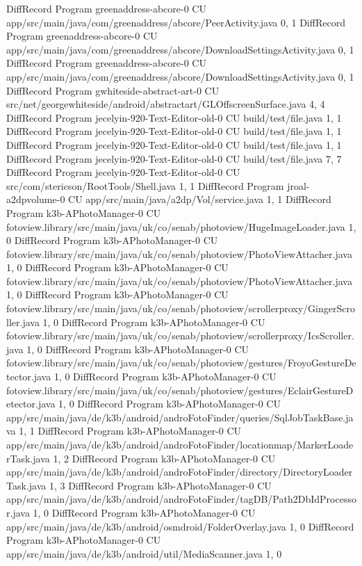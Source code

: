 DiffRecord Program greenaddress-abcore-0 CU app/src/main/java/com/greenaddress/abcore/PeerActivity.java  {0, 1}
DiffRecord Program greenaddress-abcore-0 CU app/src/main/java/com/greenaddress/abcore/DownloadSettingsActivity.java  {0, 1}
DiffRecord Program greenaddress-abcore-0 CU app/src/main/java/com/greenaddress/abcore/DownloadSettingsActivity.java  {0, 1}
DiffRecord Program gwhiteside-abstract-art-0 CU src/net/georgewhiteside/android/abstractart/GLOffscreenSurface.java  {4, 4}
DiffRecord Program jecelyin-920-Text-Editor-old-0 CU build/test/file.java  {1, 1}
DiffRecord Program jecelyin-920-Text-Editor-old-0 CU build/test/file.java  {1, 1}
DiffRecord Program jecelyin-920-Text-Editor-old-0 CU build/test/file.java  {1, 1}
DiffRecord Program jecelyin-920-Text-Editor-old-0 CU build/test/file.java  {7, 7}
DiffRecord Program jecelyin-920-Text-Editor-old-0 CU src/com/stericson/RootTools/Shell.java  {1, 1}
DiffRecord Program jroal-a2dpvolume-0 CU app/src/main/java/a2dp/Vol/service.java  {1, 1}
DiffRecord Program k3b-APhotoManager-0 CU fotoview.library/src/main/java/uk/co/senab/photoview/HugeImageLoader.java  {1, 0}
DiffRecord Program k3b-APhotoManager-0 CU fotoview.library/src/main/java/uk/co/senab/photoview/PhotoViewAttacher.java  {1, 0}
DiffRecord Program k3b-APhotoManager-0 CU fotoview.library/src/main/java/uk/co/senab/photoview/PhotoViewAttacher.java  {1, 0}
DiffRecord Program k3b-APhotoManager-0 CU fotoview.library/src/main/java/uk/co/senab/photoview/scrollerproxy/GingerScroller.java  {1, 0}
DiffRecord Program k3b-APhotoManager-0 CU fotoview.library/src/main/java/uk/co/senab/photoview/scrollerproxy/IcsScroller.java  {1, 0}
DiffRecord Program k3b-APhotoManager-0 CU fotoview.library/src/main/java/uk/co/senab/photoview/gestures/FroyoGestureDetector.java  {1, 0}
DiffRecord Program k3b-APhotoManager-0 CU fotoview.library/src/main/java/uk/co/senab/photoview/gestures/EclairGestureDetector.java  {1, 0}
DiffRecord Program k3b-APhotoManager-0 CU app/src/main/java/de/k3b/android/androFotoFinder/queries/SqlJobTaskBase.java  {1, 1}
DiffRecord Program k3b-APhotoManager-0 CU app/src/main/java/de/k3b/android/androFotoFinder/locationmap/MarkerLoaderTask.java  {1, 2}
DiffRecord Program k3b-APhotoManager-0 CU app/src/main/java/de/k3b/android/androFotoFinder/directory/DirectoryLoaderTask.java  {1, 3}
DiffRecord Program k3b-APhotoManager-0 CU app/src/main/java/de/k3b/android/androFotoFinder/tagDB/Path2DbIdProcessor.java  {1, 0}
DiffRecord Program k3b-APhotoManager-0 CU app/src/main/java/de/k3b/android/osmdroid/FolderOverlay.java  {1, 0}
DiffRecord Program k3b-APhotoManager-0 CU app/src/main/java/de/k3b/android/util/MediaScanner.java  {1, 0}
